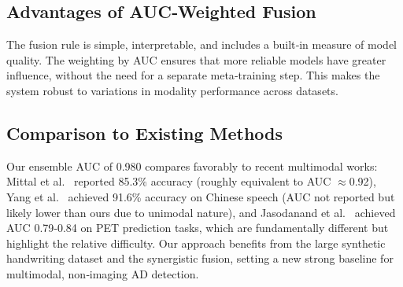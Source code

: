 \documentclass[conference]{IEEEtran}
\begin{document}
\subsection{Advantages of AUC‑Weighted Fusion}
The fusion rule is simple, interpretable, and includes a built‑in measure of model quality. The weighting by AUC ensures that more reliable models have greater influence, without the need for a separate meta‑training step. This makes the system robust to variations in modality performance across datasets.

\subsection{Comparison to Existing Methods}
Our ensemble AUC of 0.980 compares favorably to recent multimodal works: Mittal et al.~\cite{mittal2021} reported 85.3\% accuracy (roughly equivalent to AUC $\approx$0.92), Yang et al.~\cite{yang2024} achieved 91.6\% accuracy on Chinese speech (AUC not reported but likely lower than ours due to unimodal nature), and Jasodanand et al.~\cite{jasodanand2025} achieved AUC 0.79‑0.84 on PET prediction tasks, which are fundamentally different but highlight the relative difficulty. Our approach benefits from the large synthetic handwriting dataset and the synergistic fusion, setting a new strong baseline for multimodal, non‑imaging AD detection.

\end{document}
